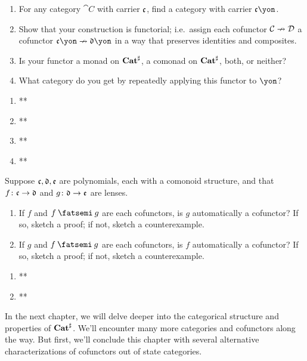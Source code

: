 \documentclass[Book-Poly]{subfiles}
\begin{document}
\begin{exercise}
\begin{enumerate}
	\item For any category $\cat{C}$ with carrier $\mathfrak{c}$, find a category with carrier $\car{c}\yon$.
	\item Show that your construction is functorial; i.e.\ assign each cofunctor $\mathcal{C}\nrightarrow\mathcal{D}$ a cofunctor $\car{c}\yon\cof\car{d}\yon$ in a way that preserves identities and composites.
	\item Is your functor a monad on $\mathbf{Cat}^\sharp$, a comonad on $\mathbf{Cat}^\sharp$, both, or neither?
	\item What category do you get by repeatedly applying this functor to $\yon$?
\qedhere
\end{enumerate}
\begin{solution}
\begin{enumerate}
    \item **
    \item **
    \item **
    \item **
\end{enumerate}
\end{solution}
\end{exercise}


\begin{exercise}
Suppose $\mathfrak{c},\mathfrak{d},\mathfrak{e}$ are polynomials, each with a comonoid structure, and that $f\colon\mathfrak{c}\to\mathfrak{d}$ and $g\colon\mathfrak{d}\to\mathfrak{e}$ are lenses.
\begin{enumerate}
	\item If $f$ and $f\then g$ are each cofunctors, is $g$ automatically a cofunctor?
	If so, sketch a proof; if not, sketch a counterexample.
	\item If $g$ and $f\then g$ are each cofunctors, is $f$ automatically a cofunctor?
	If so, sketch a proof; if not, sketch a counterexample.
\qedhere
\end{enumerate}
\begin{solution}
\begin{enumerate}
    \item **
    \item **
\end{enumerate}
\end{solution}
\end{exercise}

In the next chapter, we will delve deeper into the categorical structure and properties of $\mathbf{Cat}^\sharp$.
We'll encounter many more categories and cofunctors along the way.
But first, we'll conclude this chapter with several alternative characterizations of cofunctors out of state categories.
\end{document}
